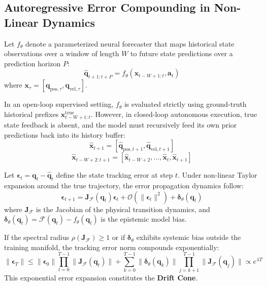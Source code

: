 \documentclass[11pt,a4paper]{article}
\begin{document}
\subsection{Autoregressive Error Compounding in Non-Linear Dynamics}
Let $f_\theta$ denote a parameterized neural forecaster that maps historical state observations over a window of length $W$ to future state predictions over a prediction horizon $P$:
\begin{equation}
    \hat{\mathbf{q}}_{t+1:t+P} = f_\theta(\mathbf{x}_{t-W+1:t}, \mathbf{a}_t)
\end{equation}
where $\mathbf{x}_\tau = [\mathbf{q}_{\text{pos}, \tau}, \mathbf{q}_{\text{vel}, \tau}]$.

In an open-loop supervised setting, $f_\theta$ is evaluated strictly using ground-truth historical prefixes $\mathbf{x}_{t-W+1:t}^{\text{true}}$. However, in closed-loop autonomous execution, true state feedback is absent, and the model must recursively feed its own prior predictions back into its history buffer:
\begin{equation}
    \hat{\mathbf{x}}_{t+1} = [\hat{\mathbf{q}}_{\text{pos}, t+1}, \hat{\mathbf{q}}_{\text{vel}, t+1}]
\end{equation}
\begin{equation}
    \hat{\mathbf{x}}_{t-W+2:t+1} = [\hat{\mathbf{x}}_{t-W+2}, \dots, \hat{\mathbf{x}}_t, \hat{\mathbf{x}}_{t+1}]
\end{equation}

Let $\boldsymbol{\epsilon}_t = \mathbf{q}_t - \hat{\mathbf{q}}_t$ define the state tracking error at step $t$. Under non-linear Taylor expansion around the true trajectory, the error propagation dynamics follow:
\begin{equation}
    \boldsymbol{\epsilon}_{t+1} = \mathbf{J}_{\mathcal{F}}(\mathbf{q}_t) \boldsymbol{\epsilon}_t + \mathcal{O}(\|\boldsymbol{\epsilon}_t\|^2) + \boldsymbol{\delta}_\theta(\mathbf{q}_t)
\end{equation}
where $\mathbf{J}_{\mathcal{F}}$ is the Jacobian of the physical transition dynamics, and $\boldsymbol{\delta}_\theta(\mathbf{q}_t) = \mathcal{F}(\mathbf{q}_t) - f_\theta(\mathbf{q}_t)$ is the epistemic model bias.

If the spectral radius $\rho(\mathbf{J}_{\mathcal{F}}) \ge 1$ or if $\boldsymbol{\delta}_\theta$ exhibits systemic bias outside the training manifold, the tracking error norm compounds exponentially:
\begin{equation}
    \|\boldsymbol{\epsilon}_T\| \le \|\boldsymbol{\epsilon}_0\| \prod_{t=0}^{T-1} \|\mathbf{J}_{\mathcal{F}}(\mathbf{q}_t)\| + \sum_{k=0}^{T-1} \|\boldsymbol{\delta}_\theta(\mathbf{q}_k)\| \prod_{j=k+1}^{T-1} \|\mathbf{J}_{\mathcal{F}}(\mathbf{q}_j)\| \propto e^{\lambda T}
\end{equation}
This exponential error expansion constitutes the \textbf{Drift Cone}.
\end{document}
